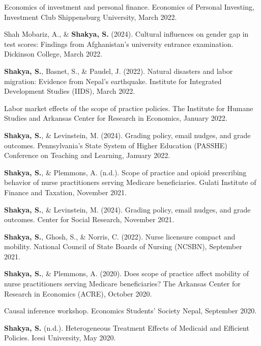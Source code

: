 \begin{etaremune}
\item Economics of investment and personal finance. Economics of Personal Investing, Investment Club Shippensburg University, March 2022.

\item Shah Mobariz, A., \& \textbf{Shakya, S.} (2024). Cultural influences on gender gap in test scores: Findings from Afghanistan's university entrance examination. Dickinson College, March 2022.

\item \textbf{Shakya, S.}, Basnet, S., \& Paudel, J. (2022). Natural disasters and labor migration: Evidence from Nepal's earthquake. Institute for Integrated Development Studies (IIDS), March 2022.

\item Labor market effects of the scope of practice policies. The Institute for Humane Studies and Arkansas Center for Research in Economics, January 2022.

\item \textbf{Shakya, S.}, \& Levinstein, M. (2024). Grading policy, email nudges, and grade outcomes. Pennsylvania's State System of Higher Education (PASSHE) Conference on Teaching and Learning, January 2022.

\item \textbf{Shakya, S.}, \& Plemmons, A. (n.d.). Scope of practice and opioid prescribing behavior of nurse practitioners serving Medicare beneficiaries. Gulati Institute of Finance and Taxation, November 2021.

\item \textbf{Shakya, S.}, \& Levinstein, M. (2024). Grading policy, email nudges, and grade outcomes. Center for Social Research, November 2021.

\item \textbf{Shakya, S.}, Ghosh, S., \& Norris, C. (2022). Nurse licensure compact and mobility. National Council of State Boards of Nursing (NCSBN), September 2021.

\item \textbf{Shakya, S.}, \& Plemmons, A. (2020). Does scope of practice affect mobility of nurse practitioners serving Medicare beneficiaries? The Arkansas Center for Research in Economics (ACRE), October 2020.

\item Causal inference workshop. Economics Students' Society Nepal, September 2020.

\item \textbf{Shakya, S.} (n.d.). Heterogeneous Treatment Effects of Medicaid and Efficient Policies. Icesi University, May 2020.
\end{etaremune}

